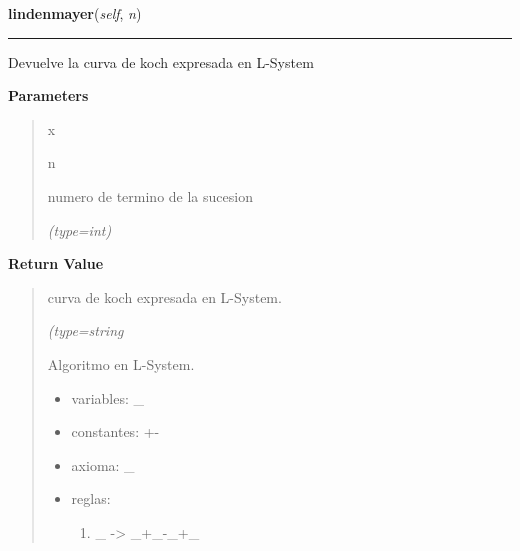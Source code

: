 \hspace{.8\funcindent}\begin{boxedminipage}{\funcwidth}

    \raggedright \textbf{lindenmayer}(\textit{self}, \textit{n})

    \vspace{-1.5ex}

    \rule{\textwidth}{0.5\fboxrule}
\setlength{\parskip}{2ex}
    Devuelve la curva de koch expresada en L-System

\setlength{\parskip}{1ex}
      \textbf{Parameters}
      \vspace{-1ex}

      \begin{quote}
        \begin{Ventry}{x}

          \item[n]

          numero de termino de la sucesion

            {\it (type=int)}

        \end{Ventry}

      \end{quote}

      \textbf{Return Value}
    \vspace{-1ex}

      \begin{quote}
      curva de koch expresada en L-System.

      {\it (type=string

      Algoritmo en L-System.

      \begin{itemize}
      \setlength{\parskip}{0.6ex}
        \item variables: \_

        \item constantes: +-

        \item axioma: \_

        \item reglas:

          \begin{enumerate}

          \setlength{\parskip}{0.5ex}
            \item \_ -{\textgreater} \_+\_-\_+\_

          \end{enumerate}


\end{itemize}}
\end{quote}
\end{boxedminipage}
